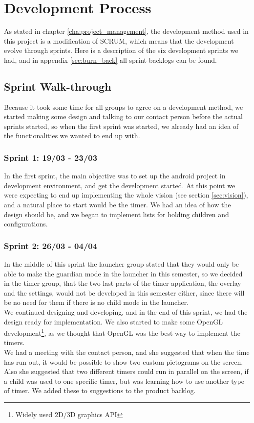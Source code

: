 \chapter{Development Process}
As stated in chapter \ref{cha:project_management}, the development method used in this project is a modification of SCRUM, which means that the development evolve through sprints. Here is a description of the six development sprints we had, and in appendix \ref{sec:burn_back} all sprint backlogs can be found.

\section{Sprint Walk-through}
Because it took some time for all groups to agree on a development method, we started making some design and talking to our contact person before the actual sprints started, so when the first sprint was started, we already had an idea of the functionalities we wanted to end up with.

\subsection*{Sprint 1: 19/03 - 23/03}
In the first sprint, the main objective was to set up the android project in development environment, and get the development started. At this point we were expecting to end up implementing the whole vision (see section \ref{sec:vision}), and a natural place to start would be the timer. We had an idea of how the design should be, and we began to implement lists for holding children and configurations.

\subsection*{Sprint 2: 26/03 - 04/04}
In the middle of this sprint the launcher group stated that they would only be able to make the guardian mode in the launcher in this semester, so we decided in the timer group, that the two last parts of the timer application, the overlay and the settings, would not be developed in this semester either, since there will be no need for them if there is no child mode in the launcher.\\
	We continued designing and developing, and in the end of this sprint, we had the design ready for implementation. We also started to make some OpenGL development\footnote{Widely used 2D/3D graphics API}, as we thought that OpenGL was the best way to implement the timers.\\
	We had a meeting with the contact person, and she suggested that when the time has run out, it would be possible to show two custom pictograms on the screen. Also she suggested that two different timers could run in parallel on the screen, if a child was used to one specific timer, but was learning how to use another type of timer. We added these to suggestions to the product backlog.

